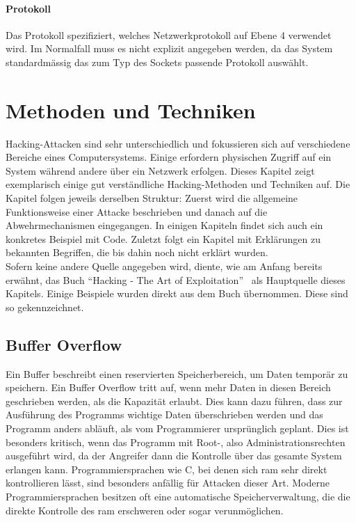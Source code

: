 \documentclass[11pt, a4paper]{article}
\begin{document}
\paragraph{Protokoll}
Das Protokoll spezifiziert, welches Netzwerkprotokoll auf Ebene 4 verwendet wird. Im Normalfall muss es nicht explizit angegeben werden, da das System standardmässig das zum Typ des Sockets passende Protokoll auswählt.

\newpage
\section{Methoden und Techniken}\label{sec:methoden-und-techniken}
Hacking-Attacken sind sehr unterschiedlich und fokussieren sich auf verschiedene Bereiche eines Computersystems. Einige erfordern physischen Zugriff auf ein System während andere über ein Netzwerk erfolgen. Dieses Kapitel zeigt exemplarisch einige gut verständliche Hacking-Methoden und Techniken auf. Die Kapitel folgen jeweils derselben Struktur: Zuerst wird die allgemeine Funktionsweise einer Attacke beschrieben und danach auf die Abwehrmechanismen eingegangen. In einigen Kapiteln findet sich auch ein konkretes Beispiel mit Code. Zuletzt folgt ein Kapitel mit Erklärungen zu bekannten Begriffen, die bis dahin noch nicht erklärt wurden. \\Sofern keine andere Quelle angegeben wird, diente, wie am Anfang bereits erwähnt, das Buch ``Hacking - The Art of Exploitation''~\cite{erickson2008hacking} als Hauptquelle dieses Kapitels. Einige Beispiele wurden direkt aus dem Buch übernommen. Diese sind so gekennzeichnet.

\subsection{Buffer Overflow}\label{subsec:buffer-overflow}
Ein Buffer beschreibt einen reservierten Speicherbereich, um Daten temporär zu speichern. Ein Buffer Overflow tritt auf, wenn mehr Daten in diesen Bereich geschrieben werden, als die Kapazität erlaubt. Dies kann dazu führen, dass zur Ausführung des Programms wichtige Daten überschrieben werden und das Programm anders abläuft, als vom Programmierer ursprünglich geplant. Dies ist besonders kritisch, wenn das Programm mit Root-, also Administrationsrechten ausgeführt wird, da der Angreifer dann die Kontrolle über das gesamte System erlangen kann. Programmiersprachen wie C, bei denen sich \gls{ram} sehr direkt kontrollieren lässt, sind besonders anfällig für Attacken dieser Art. Moderne Programmiersprachen besitzen oft eine automatische Speicherverwaltung, die die direkte Kontrolle des \gls{ram} erschweren oder sogar verunmöglichen.
\end{document}
